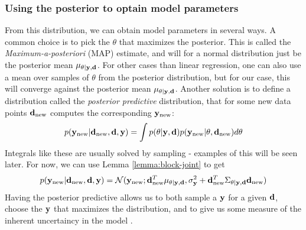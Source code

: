 \subsubsection{Using the posterior to optain model parameters}
From this distribution, we can obtain model parameters in several ways. 
A common choice is to pick the $\theta$ that maximizes the posterior. This is called the \textit{Maximum-a-posteriori} (MAP) estimate, and will for a normal distribution just be the posterior mean $\mu_{\theta | \mathbf{y}, \mathbf{d}}$.
For other cases than linear regression, one can also use a mean over samples of $\theta$ from the posterior distribution, but for our case, this will converge against the posterior mean $\mu_{\theta | \mathbf{y}, \mathbf{d}}$.
Another solution is to define a distribution called the \textit{posterior predictive} distribution, that for some new data points $\mathbf{d}_{\textrm{new}}$ computes the corresponding $\mathbf{y}_{\textrm{new}}$:
\begin{equation}p(\mathbf{y}_{\textrm{new}} | \mathbf{d}_{\textrm{new}}, \mathbf{d}, \mathbf{y}) = \int p(\theta | \mathbf{y}, \mathbf{d}) p(\mathbf{y}_{\textrm{new}} | \theta, \mathbf{d}_\textrm{new})d\theta\end{equation}
Integrals like these are usually solved by sampling - examples of this will be seen later. For now, we can use Lemma \ref{lemma:block-joint} to get
\begin{equation}p(\mathbf{y}_{\textrm{new}} | \mathbf{d}_{\textrm{new}}, \mathbf{d}, \mathbf{y}) = \mathcal{N}(\mathbf{y}_\textrm{new}; \mathbf{d}_\textrm{new}^T\mu_{\theta|\mathbf{y}, \mathbf{d}}, \sigma^2_{\mathbf{y}} + \mathbf{d}_\textrm{new}^T\Sigma_{\theta | \mathbf{y}, \mathbf{d}}\mathbf{d}_\textrm{new})\end{equation}
Having the posterior predictive allows us to both sample a $\mathbf{y}$ for a given $\mathbf{d}$, choose the $\mathbf{y}$ that maximizes the distribution, and to give us some measure of the inherent uncertaincy in the model \cite{krause22}.

